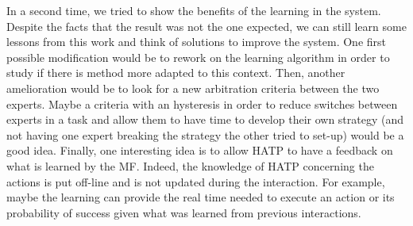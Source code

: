 \documentclass[english,a4paper,11pt,twoside]{StyleThese}
\begin{document}
In a second time, we tried to show the benefits of the learning in the system. Despite the facts that the result was not the one expected, we can still learn some lessons from this work and think of solutions to improve the system. One first possible modification would be to rework on the learning algorithm in order to study if there is method more adapted to this context. Then, another amelioration would be to look for a new arbitration criteria between the two experts. Maybe a criteria with an hysteresis in order to reduce switches between experts in a task and allow them to have time to develop their own strategy (and not having one expert breaking the strategy the other tried to set-up) would be a good idea. Finally, one interesting idea is to allow HATP to have a feedback on what is learned by the MF. Indeed, the knowledge of HATP concerning the actions is put off-line and is not updated during the interaction. For example, maybe the learning can provide the real time needed to execute an action or its probability of success given what was learned from previous interactions.


\ifdefined{}
\else


\end{document}
